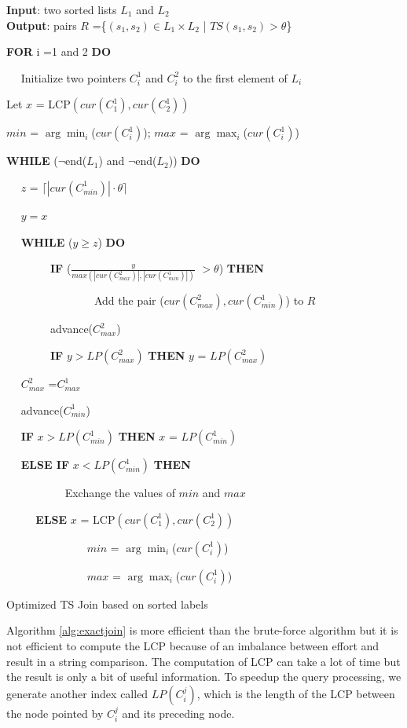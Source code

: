 \begin{algorithm}
{\bf Input}: two sorted lists  $L_1$ and $L_2$\\
{\bf Output}: pairs $R$ =\{$(s_1,s_2) \in L_1 \times L_2$ | $TS(s_1, s_2) > \theta$\}
\begin{compactenum}[(1)]
\item {\bf FOR}  i =1 and 2 {\bf DO}
\item ~~ Initialize two pointers $C_i^1$ and $C_i^2$ to the first element of  $L_i$
\item Let $x$ = LCP$(cur(C_1^1),cur(C_2^1))$
\item $min$ = $\arg\min_{i}$($cur(C_i^1)$); $max$ = $\arg\max_{i}$($cur(C_i^1)$)
\item {\bf WHILE}  ($\neg$end($L_1$) and $\neg$end($L_2$)) {\bf DO}
\item ~~ $z$ = $\lceil |cur(C_{min}^1)| \cdot \theta  \rceil$
\item ~~ $y = x$
\item ~~ {\bf WHILE} ($y \geq z$) {\bf DO}
\item ~~ ~~ ~~ {\bf IF} ($\frac{y}{max(|cur(C_{max}^2)|,|cur(C_{min}^1)|)}$ $> \theta$) {\bf THEN}
\item ~~ ~~ ~~ ~~ ~~ ~~ Add  the pair ($cur(C_{max}^2),cur(C_{min}^1)$) to $R$
\item ~~ ~~ ~~  advance($C_{max}^2$)
\item ~~ ~~ ~~ {\bf IF} $y > LP(C_{max}^2)$  {\bf THEN} $y$ = $LP(C_{max}^2)$
\item ~~ $C_{max}^2$ =$C_{max}^1$
\item ~~ advance($C_{min}^1$)
\item ~~  {\bf IF} $x > LP(C_{min}^1)$  {\bf THEN} $x$ = $LP(C_{min}^1)$
\item ~~ {\bf ELSE IF}  $x < LP(C_{min}^1)$  {\bf THEN}
\item ~~ ~~ ~~ ~~ Exchange the values of $min$ and $max$
\item ~~  ~~ {\bf ELSE }  $x$ = LCP$(cur(C_{1}^1),cur(C_{2}^1))$
\item ~~ ~~~~ ~~~~ ~~ $min$ = $\arg\min_{i}$($cur(C_i^1)$)
\item ~~ ~~~~ ~~~~ ~~ $max$ = $\arg\max_{i}$($cur(C_i^1)$)
\end{compactenum}
\caption{Optimized TS Join based on sorted labels}
\label{alg:LCPSortJoin}
\end{algorithm}


 Algorithm \ref{alg:exactjoin} is more efficient than the brute-force algorithm but it is not efficient to compute the LCP  because of an imbalance between effort and result in a string comparison. The computation of LCP can take a lot of time but the result is only a bit of useful information.  To speedup the query processing, we generate another index called  $LP(C_i^j)$, which is the length of the LCP between the node pointed by $C_i^j$ and its preceding node.


